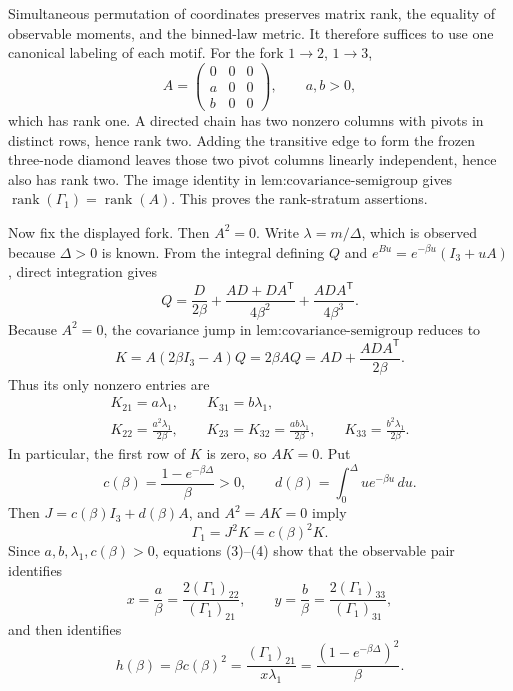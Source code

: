 Simultaneous permutation of coordinates preserves matrix rank, the equality of observable moments, and the binned-law metric.  It therefore suffices to use one canonical labeling of each motif.  For the fork \(1\to2\), \(1\to3\),
\[
 A=\begin{pmatrix}0&0&0\\a&0&0\\b&0&0\end{pmatrix},\qquad a,b>0,
\]
which has rank one.  A directed chain has two nonzero columns with pivots in distinct rows, hence rank two.  Adding the transitive edge to form the frozen three-node diamond leaves those two pivot columns linearly independent, hence also has rank two.  The image identity in \(\text{lem:covariance-semigroup}\) gives \(\operatorname{rank}(\Gamma_1)=\operatorname{rank}(A)\).  This proves the rank-stratum assertions.

Now fix the displayed fork.  Then \(A^2=0\).  Write \(\lambda=m/\Delta\), which is observed because \(\Delta>0\) is known.  From the integral defining \(Q\) and \(e^{Bu}=e^{-\beta u}(I_3+uA)\), direct integration gives
\[
 Q=\frac{D}{2\beta}+\frac{AD+DA^{\mathsf T}}{4\beta^2}
   +\frac{ADA^{\mathsf T}}{4\beta^3}.                            \tag{1}
\]
Because \(A^2=0\), the covariance jump in \(\text{lem:covariance-semigroup}\) reduces to
\[
 K=A(2\beta I_3-A)Q=2\beta AQ
 =AD+\frac{ADA^{\mathsf T}}{2\beta}.                             \tag{2}
\]
Thus its only nonzero entries are
\[
\begin{gathered}
 K_{21}=a\lambda_1,\qquad K_{31}=b\lambda_1,\\
 K_{22}=\frac{a^2\lambda_1}{2\beta},\qquad
 K_{23}=K_{32}=\frac{ab\lambda_1}{2\beta},\qquad
 K_{33}=\frac{b^2\lambda_1}{2\beta}.                            \tag{3}
\end{gathered}
\]
In particular, the first row of \(K\) is zero, so \(AK=0\).  Put
\[
 c(\beta)=\frac{1-e^{-\beta\Delta}}{\beta}>0,\qquad
 d(\beta)=\int_0^\Delta ue^{-\beta u}\,du .
\]
Then \(J=c(\beta)I_3+d(\beta)A\), and \(A^2=AK=0\) imply
\[
 \Gamma_1=J^2K=c(\beta)^2K.                                     \tag{4}
\]
Since \(a,b,\lambda_1,c(\beta)>0\), equations (3)--(4) show that the observable pair identifies
\[
 x=\frac a\beta=\frac{2(\Gamma_1)_{22}}{(\Gamma_1)_{21}},\qquad
 y=\frac b\beta=\frac{2(\Gamma_1)_{33}}{(\Gamma_1)_{31}},        \tag{5}
\]
and then identifies
\[
 h(\beta)=\beta c(\beta)^2
 =\frac{(\Gamma_1)_{21}}{x\lambda_1}
 =\frac{(1-e^{-\beta\Delta})^2}{\beta}.                         \tag{6}
\]

